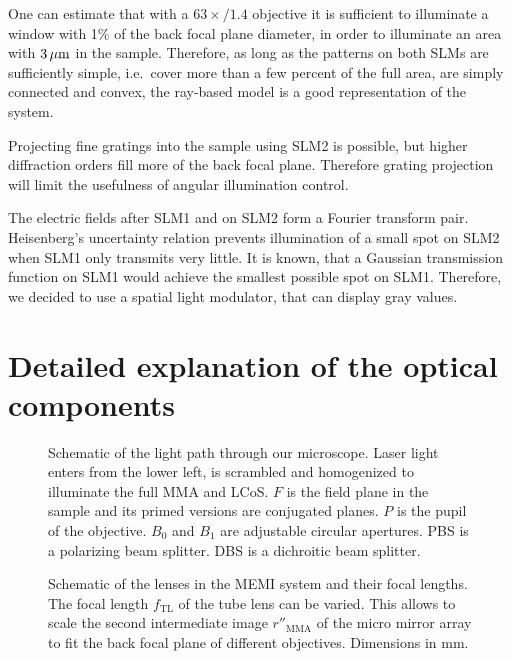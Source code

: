 One can estimate that with a $63\!\!\times\!\!/1.4$ objective it is
sufficient to illuminate a window with 1\% of the back focal plane
diameter, in order to illuminate an area with $\unit[3]{\mu m}$ in the
sample.  Therefore, as long as the patterns on both SLMs are
sufficiently simple, i.e.\ cover more than a few percent of the full
area, are simply connected and convex, %
the ray-based model is a good representation of the system.

Projecting fine gratings into the sample using SLM2 is possible, but
higher diffraction orders fill more of the back focal plane. Therefore
grating projection will limit the usefulness of angular illumination
control.

The electric fields after SLM1 and on SLM2 form a Fourier transform
pair. Heisenberg's uncertainty relation prevents illumination of a
small spot on SLM2 when SLM1 only transmits very little. It is known,
that a Gaussian transmission function on SLM1 would achieve the
smallest possible spot on SLM1. Therefore, we decided to use a spatial
light modulator, that can display gray values.

\section{Detailed explanation of the optical components}


\begin{figure}[!htbp]
  \centering
  \def\svgscale{2}
  
  \caption{Schematic of the light path through our microscope. Laser
    light enters from the lower left, is scrambled and homogenized to
    illuminate the full MMA and LCoS. $F$ is the field plane in the
    sample and its primed versions are conjugated planes. $P$ is the
    pupil of the objective. $B_0$ and $B_1$ are adjustable circular
    apertures. PBS is a polarizing beam splitter. DBS is a dichroitic
    beam splitter.}
  \label{fig:memi-real}
\end{figure}

\begin{figure}[!htbp]
   \centering
   \def\svgscale{2}
   
   \caption{Schematic of the lenses in the MEMI system and their focal
     lengths. The focal length $f_\textrm{TL}$ of the tube lens can be
     varied. This allows to scale the second intermediate image
     $r''_\textrm{MMA}$ of the micro mirror array to fit the back
     focal plane of different objectives. Dimensions in mm.}
   \label{fig:memi-sketch}
 \end{figure}
 
